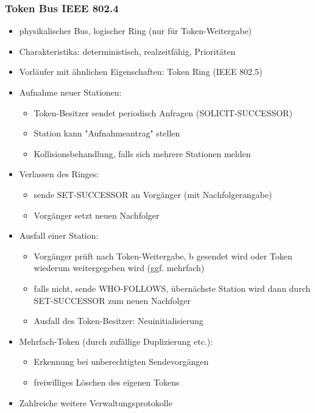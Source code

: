 \subsubsection{Token Bus IEEE 802.4}
\begin{itemize}
	\item physikalischer Bus, logischer Ring (nur für Token-Weitergabe)
	\item Charakteristika: deterministisch, realzeitfähig, Prioritäten
	\item Vorläufer mit ähnlichen Eigenschaften: Token Ring (IEEE 802.5)
	\item Aufnahme neuer Stationen:
	\begin{itemize}
		\item Token-Besitzer sendet periodisch Anfragen (SOLICIT-SUCCESSOR)
		\item Station kann "Aufnahmeantrag" stellen
		\item Kollisionsbehandlung, falls sich mehrere Stationen melden
	\end{itemize}
	\item Verlassen des Ringes:
	\begin{itemize}
		\item sende SET-SUCCESSOR an Vorgänger (mit Nachfolgerangabe)
		\item Vorgänger setzt neuen Nachfolger
	\end{itemize}
	\item Ausfall einer Station:
	\begin{itemize}
		\item Vorgänger prüft nach Token-Weitergabe, b gesendet wird oder Token wiederum weitergegeben wird (ggf. mehrfach)
		\item falls nicht, sende WHO-FOLLOWS, übernächste Station wird dann durch SET-SUCCESSOR zum neuen Nachfolger
		\item Ausfall des Token-Besitzer: Neuinitialisierung
	\end{itemize}
	\item Mehrfach-Token (durch zufällige Duplizierung etc.):
	\begin{itemize}
		\item Erkennung bei unberechtigten Sendevorgängen
		\item freiwilliges Löschen des eigenen Tokens
	\end{itemize}
	\item Zahlreiche weitere Verwaltungsprotokolle
\end{itemize}

